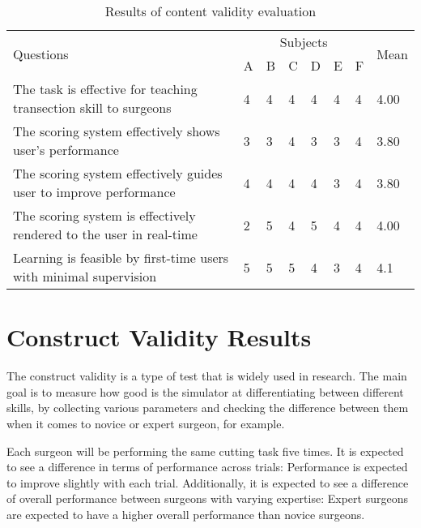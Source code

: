 \begin{table}
\small
\centering
\begin{tabular}{p{6cm}p{0.5cm}p{0.5cm}p{0.5cm}p{0.5cm}p{0.5cm}p{0.5cm}p{0.8cm}}
  \multirow{2}{4em}{Questions} & \multicolumn{6}{c}{Subjects} & \multirow{2}{4em}{Mean} \\
  \cmidrule{2-7}
  & A & B & C & D & E & F &\\
  \toprule
  The task is effective for teaching transection skill to surgeons
  & 4& 4& 4& 4 & 4& 4 & 4.00\\
  \midrule
  The scoring system effectively shows user's performance
  & 3& 3& 4 & 3 & 3 & 4 & 3.80\\
  \midrule
  The scoring system effectively guides user to improve performance
  & 4 & 4 & 4& 4& 3 & 4 & 3.80\\
  \midrule
  The scoring system is effectively rendered to the user in real-time
  & 2 & 5 & 4& 5& 4 & 4 & 4.00\\
  \midrule
  Learning is feasible by first-time users with minimal supervision & 5 & 5 & 5 & 4 & 3& 4 & 4.1\\
  \bottomrule
\end{tabular}
\caption{Results of content validity evaluation}
\label{tab:contentTable2}
\end{table}

\section{Construct Validity Results}
\label{sec:construct}

The construct validity is a type of test that is widely used in research. The main goal is to measure how good is the simulator at differentiating between different skills, by collecting various parameters and checking the difference between them when it comes to novice or expert surgeon, for example.

Each surgeon will be performing the same cutting task five times. It is expected to see a difference in terms of performance across trials: Performance is expected to improve slightly with each trial. Additionally, it is expected to see a difference of overall performance between surgeons with varying expertise: Expert surgeons are expected to have a higher overall performance than novice surgeons.


